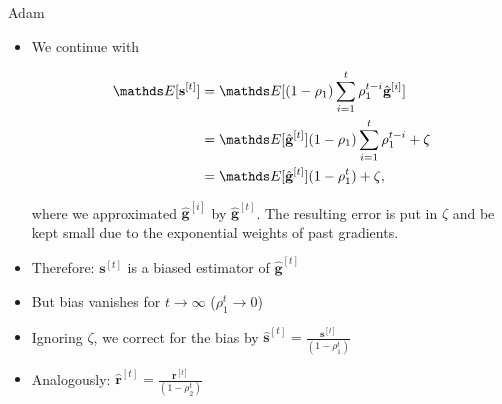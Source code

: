 \documentclass[11pt,compress,t,notes=noshow, xcolor=table]{beamer}
\begin{document}
\begin{vbframe}{Adam}
	
	\begin{itemize}
		\item We continue with
    		\begin{footnotesize}
        		\begin{align*}
        		      \E [\mathbf{s}^{[t]}] &= \E [ (1 - \rho_1) \sum_{i=1}^t \rho_1^{t - i} \hat{\mathbf{g}}^{[i]}] \\
        		      &= \E [\hat{\mathbf{g}}^{[t]}] (1 - \rho_1) \sum_{i=1}^t \rho_1^{t - i} + \zeta\\
        		      &= \E [\hat{\mathbf{g}}^{[t]}] (1 - \rho_1^{t}) + \zeta,
        		\end{align*}
    		\end{footnotesize}
      
    		where we approximated $\hat{\mathbf{g}}^{[i]}$ by $\hat{\mathbf{g}}^{[t]}$.
            The resulting error is put in $\zeta$ and be kept small due to the exponential weights of past gradients.
		\item Therefore: $\mathbf{s}^{[t]}$ is a biased estimator of $\hat{\mathbf{g}}^{[t]}$
        \item But bias vanishes for $t \to \infty$ ($\rho_1^t \rightarrow 0$)
		\item Ignoring $\zeta$, we correct for the bias by $\hat{\mathbf{s}}^{[t]} = \frac{\mathbf{s}^{[t]}}{(1 - \rho_1^{t})}$
		\item Analogously: $\hat{\mathbf{r}}^{[t]} = \frac{\mathbf{r}^{[t]}}{(1 - \rho_2^{t})}$
	\end{itemize}
\end{vbframe}

\end{document}
